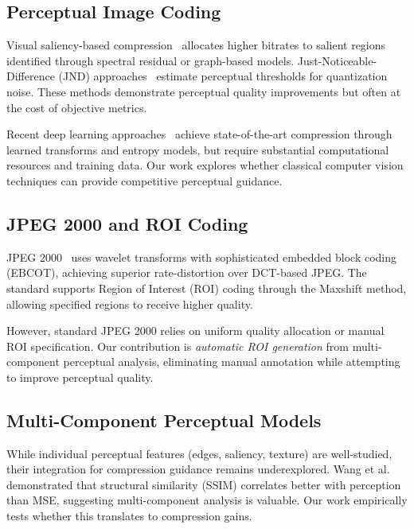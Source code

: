 \documentclass[conference]{IEEEtran}
\begin{document}
\subsection{Perceptual Image Coding}

Visual saliency-based compression~\cite{guo2010visual} allocates higher bitrates to salient regions identified through spectral residual or graph-based models. Just-Noticeable-Difference (JND) approaches~\cite{wu2017just} estimate perceptual thresholds for quantization noise. These methods demonstrate perceptual quality improvements but often at the cost of objective metrics.

Recent deep learning approaches~\cite{balle2018variational,minnen2018joint} achieve state-of-the-art compression through learned transforms and entropy models, but require substantial computational resources and training data. Our work explores whether classical computer vision techniques can provide competitive perceptual guidance.

\subsection{JPEG 2000 and ROI Coding}

JPEG 2000~\cite{taubman2002jpeg2000} uses wavelet transforms with sophisticated embedded block coding (EBCOT), achieving superior rate-distortion over DCT-based JPEG. The standard supports Region of Interest (ROI) coding through the Maxshift method, allowing specified regions to receive higher quality.

However, standard JPEG 2000 relies on uniform quality allocation or manual ROI specification. Our contribution is \textit{automatic ROI generation} from multi-component perceptual analysis, eliminating manual annotation while attempting to improve perceptual quality.

\subsection{Multi-Component Perceptual Models}

While individual perceptual features (edges, saliency, texture) are well-studied, their integration for compression guidance remains underexplored. Wang et al.~\cite{wang2004image} demonstrated that structural similarity (SSIM) correlates better with perception than MSE, suggesting multi-component analysis is valuable. Our work empirically tests whether this translates to compression gains.
\end{document}
